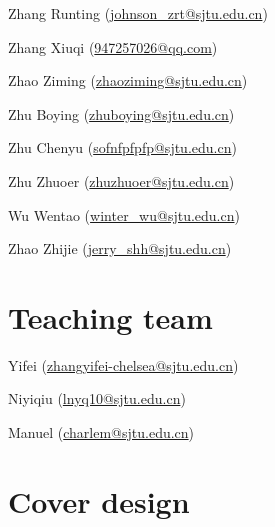 Zhang Runting (\href{mailto:johnson_zrt@sjtu.edu.cn}{johnson\_zrt@sjtu.edu.cn})

Zhang Xiuqi (\href{mailto:947257026@qq.com}{947257026@qq.com})

Zhao Ziming (\href{mailto:zhaoziming@sjtu.edu.cn}{zhaoziming@sjtu.edu.cn})

Zhu Boying (\href{mailto:zhuboying@sjtu.edu.cn}{zhuboying@sjtu.edu.cn})

Zhu Chenyu (\href{mailto:sofnfpfpfp@sjtu.edu.cn}{sofnfpfpfp@sjtu.edu.cn})

Zhu Zhuoer (\href{mailto:zhuzhuoer@sjtu.edu.cn}{zhuzhuoer@sjtu.edu.cn})

Wu Wentao (\href{mailto:winter_wu@sjtu.edu.cn}{winter\_wu@sjtu.edu.cn})

Zhao Zhijie (\href{mailto:jerry_shh@sjtu.edu.cn}{jerry\_shh@sjtu.edu.cn})

\section*{Teaching team}
Yifei (\href{mailto:zhangyifei-chelsea@sjtu.edu.cn}{zhangyifei-chelsea@sjtu.edu.cn})

Niyiqiu (\href{mailto:lnyq10@sjtu.edu.cn}{lnyq10@sjtu.edu.cn})

Manuel (\href{mailto:charlem@sjtu.edu.cn}{charlem@sjtu.edu.cn})

\section*{Cover design}
